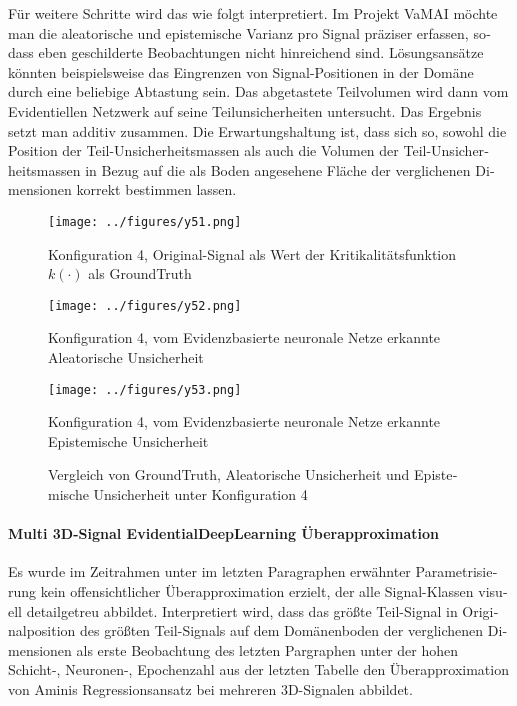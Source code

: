 \begin{otherlanguage}{ngerman}
Für weitere Schritte wird das wie folgt interpretiert. Im Projekt VaMAI möchte man die aleatorische und epistemische Varianz pro Signal präziser erfassen, sodass eben geschilderte Beobachtungen nicht hinreichend sind. Lösungsansätze könnten beispielsweise das Eingrenzen von Signal-Positionen in der Domäne durch eine beliebige Abtastung sein. Das abgetastete Teilvolumen wird dann vom Evidentiellen Netzwerk auf seine Teilunsicherheiten untersucht. Das Ergebnis setzt man additiv zusammen. Die Erwartungshaltung ist, dass sich so, sowohl die Position der Teil-Unsicherheitsmassen als auch die Volumen der Teil-Unsicherheitsmassen in Bezug auf die als Boden angesehene Fläche der verglichenen Dimensionen korrekt bestimmen lassen. 



\begin{figure}[!ht]
  \centering

  \begin{minipage}[t]{0.32\textwidth}
    \centering
    \texttt{[image: ../figures/y51.png]}
    \caption*{Konfiguration 4, Original-Signal als Wert der Kritikalitätsfunktion \(k(\cdot)\) als \gls{GroundTruth}}
    \label{fig:bild41}
  \end{minipage}
  \hfill
  \begin{minipage}[t]{0.32\textwidth}
    \centering
    \texttt{[image: ../figures/y52.png]}
    \caption*{Konfiguration 4, vom \gls{Evidenzbasierte neuronale Netze} erkannte \gls{Aleatorische Unsicherheit}}
    \label{fig:bild42}
  \end{minipage}
  \hfill
  \begin{minipage}[t]{0.32\textwidth}
    \centering
    \texttt{[image: ../figures/y53.png]}
    \caption*{Konfiguration 4, vom \gls{Evidenzbasierte neuronale Netze} erkannte \gls{Epistemische Unsicherheit}}
    \label{fig:bild43}
  \end{minipage}

  \caption{Vergleich von \gls{GroundTruth}, \gls{Aleatorische Unsicherheit} und \gls{Epistemische Unsicherheit} unter Konfiguration 4}
  \label{fig:three_subfigures4}
\end{figure}



\paragraph{Multi 3D-Signal \gls{EvidentialDeepLearning} Überapproximation} Es wurde im Zeitrahmen unter im letzten Paragraphen erwähnter Parametrisierung kein offensichtlicher Überapproximation erzielt, der alle Signal-Klassen visuell detailgetreu abbildet. Interpretiert wird, dass das größte Teil-Signal in Originalposition des größten Teil-Signals auf dem Domänenboden der verglichenen Dimensionen als erste Beobachtung des letzten Pargraphen unter der hohen Schicht-, Neuronen-, Epochenzahl aus der letzten Tabelle den Überapproximation von Aminis Regressionsansatz bei mehreren 3D-Signalen abbildet.  




\end{otherlanguage}
